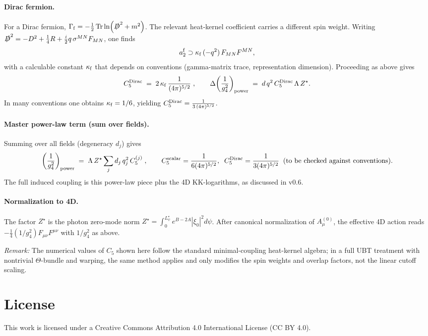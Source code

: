 \documentclass[12pt]{article}
\begin{document}
\paragraph{Dirac fermion.}
For a Dirac fermion, $\Gamma_{\rm f} = -\frac{1}{2}\Tr\ln(\slashed{D}^2 + m^2)$. The relevant heat-kernel coefficient carries a different
spin weight. Writing $\slashed{D}^2 = -D^2 + \frac{1}{4}R + \frac{i}{2}q\,\sigma^{MN}F_{MN}$, one finds
\begin{equation}
a_2^{\rm f} \supset \kappa_{\rm f}\,(-q^2)\,F_{MN}F^{MN},
\end{equation}
with a calculable constant $\kappa_{\rm f}$ that depends on conventions (gamma-matrix trace, representation dimension).
Proceeding as above gives
\begin{equation}
C_5^{\rm Dirac} \;=\; 2\,\kappa_{\rm f}\,\frac{1}{(4\pi)^{5/2}}\;,
\qquad
\Delta\!\left(\frac{1}{g_4^2}\right)_{\rm power} \;=\; d\,q^2\, C_5^{\rm Dirac}\, \Lambda\, Z^\star.
\end{equation}
In many conventions one obtains $\kappa_{\rm f} = 1/6$, yielding $C_5^{\rm Dirac} = \frac{1}{3\,(4\pi)^{5/2}}$.

\paragraph{Master power-law term (sum over fields).}
Summing over all fields (degeneracy $d_j$) gives
\begin{equation}
\left(\frac{1}{g_4^2}\right)_{\rm power} \;=\; \Lambda\, Z^\star \sum_j d_j\,q_j^2\, C_5^{(j)} \;,
\qquad
C_5^{\rm scalar}=\frac{1}{6(4\pi)^{5/2}},\;\;
C_5^{\rm Dirac} = \frac{1}{3(4\pi)^{5/2}} \;\; (\text{to be checked against conventions}).
\end{equation}
The full induced coupling is this power-law piece plus the 4D KK-logarithms, as discussed in v0.6.

\paragraph{Normalization to 4D.}
The factor $Z^\star$ is the photon zero-mode norm $Z^\star=\int_0^{L_\psi^\star} e^{B-2A}|\xi_0|^2 d\psi$. After canonical normalization
of $A_\mu^{(0)}$, the effective 4D action reads $-\tfrac{1}{4}(1/g_4^2)F_{\mu\nu}F^{\mu\nu}$ with $1/g_4^2$ as above.

\bigskip
\noindent\emph{Remark:} The numerical values of $C_5$ shown here follow the standard minimal-coupling heat-kernel algebra; in a full UBT
treatment with nontrivial $\Theta$-bundle and warping, the same method applies and only modifies the spin weights and overlap factors,
not the linear cutoff scaling.


\section*{License}
This work is licensed under a Creative Commons Attribution 4.0 International License (CC BY 4.0).
\end{document}
